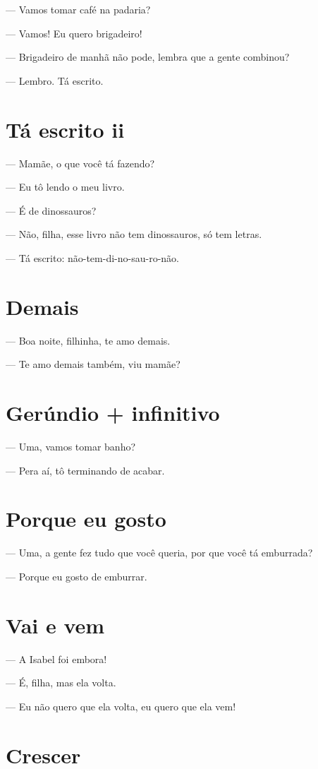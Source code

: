{— Vamos tomar café na padaria?

— Vamos! Eu quero brigadeiro!

— Brigadeiro de manhã não pode, lembra que a gente combinou?

— Lembro. Tá escrito.

\chapter{Tá escrito ii}

— Mamãe, o que você tá fazendo?

— Eu tô lendo o meu livro.

— É de dinossauros?

— Não, filha, esse livro não tem dinossauros, só tem letras.

— Tá escrito: não-tem-di-no-sau-ro-não.

\chapter{Demais}

— Boa noite, filhinha, te amo demais.

— Te amo demais também, viu mamãe?

\chapter{Gerúndio + infinitivo}

— Uma, vamos tomar banho?

— Pera aí, tô terminando de acabar.

\chapter{Porque eu gosto}

— Uma, a gente fez tudo que você queria, por que você tá emburrada?

— Porque eu gosto de emburrar.

\chapter{Vai e vem}

— A Isabel foi embora!

— É, filha, mas ela volta.

— Eu não quero que ela volta, eu quero que ela vem!

\chapter{Crescer}

}
